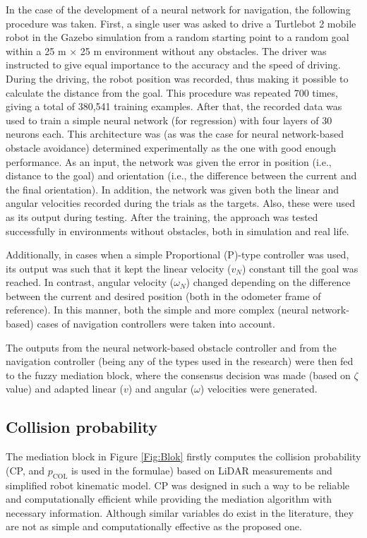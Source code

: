 In the case of the development of a neural network for navigation, the following procedure was taken. First, a single user was asked to drive a Turtlebot 2 mobile robot in the Gazebo simulation from a random starting point to a random goal within a 25 m $\times$ 25 m environment without any obstacles. The driver was instructed to give equal importance to the accuracy and the speed of driving. During the driving, the robot position was recorded, thus making it possible to calculate the distance from the goal. This procedure was repeated 700 times, giving a total of 380,541 training examples. After that, the recorded data was used to train a simple neural network (for regression) with four layers of 30 neurons each. This architecture was (as was the case for neural network-based obstacle avoidance) determined experimentally as the one with good enough performance. As an input, the network was given the error in position (i.e., distance to the goal) and orientation (i.e., the difference between the current and the final orientation). In addition, the network was given both the linear and angular velocities recorded during the trials as the targets. Also, these were used as its output during testing. After the training, the approach was tested successfully in environments without obstacles, both in simulation and real life. 

Additionally, in cases when a simple Proportional (P)-type controller was used, its output was such that it kept the linear velocity ($v_N$) constant till the goal was reached. In contrast, angular velocity ($\omega_N$) changed depending on the difference between the current and desired position (both in the odometer frame of reference). In this manner, both the simple and more complex (neural network-based) cases of navigation controllers were taken into account.

The outputs from the neural network-based obstacle controller and from the navigation controller (being any of the types used in the research) were then fed to the fuzzy mediation block, where the consensus decision was made (based on $\zeta$ value) and adapted linear ($v$) and angular ($\omega$) velocities were generated.

\subsection{Collision probability}

 The mediation block in Figure \ref{Fig:Blok} firstly computes the collision probability (CP, and $p_{\textrm{COL}}$ is used in the formulae) based on LiDAR measurements and simplified robot kinematic model. CP was designed in such a way to be reliable and computationally efficient while providing the mediation algorithm with necessary information. Although similar variables do exist in the literature, they are not as simple and computationally effective \cite{Coenen2014} as the proposed one.

